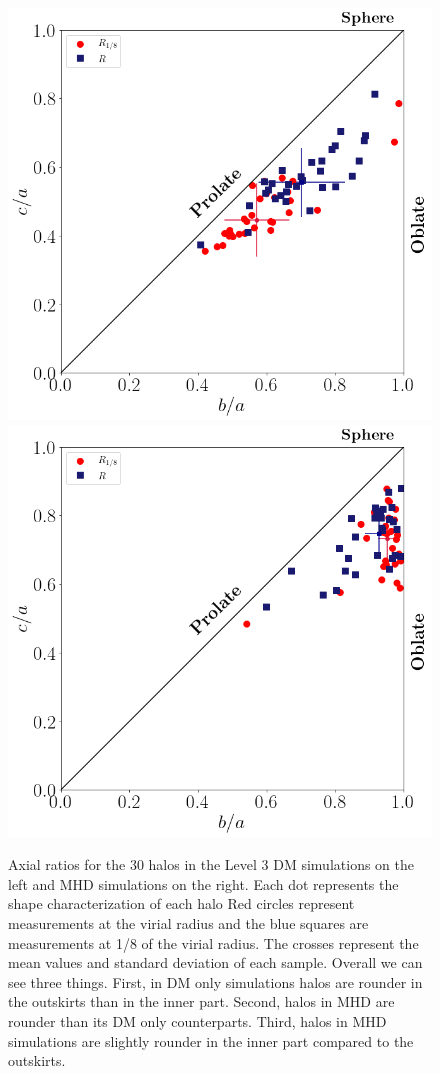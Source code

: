 \documentclass[a4paper,fleqn,usenatbib]{mnras}
\begin{document}
 
\begin{figure}
\begin{center}
\includegraphics[width=0.9\columnwidth]{./pics/Triaxial_Plane/Lvl_4_Triax_Plane_DM.png}
 \includegraphics[width=0.9\columnwidth]{./pics/Triaxial_Plane/Lvl_4_Triax_Plane_MHD.png}
\end{center}
\caption{Axial ratios for the 30 halos in the Level 3 DM simulations
  on the left and MHD simulations on the right.
   Each dot represents the shape characterization of each halo 
   Red circles represent measurements at the virial radius and the
   blue squares are measurements at 1/8 of the virial radius.   
   The crosses represent the mean values and standard deviation of
   each sample.
   Overall we can see three things. 
   First, in DM only simulations halos are rounder in the outskirts
   than in the inner part.
   Second, halos in MHD are rounder than its DM only counterparts.
   Third, halos in MHD simulations are slightly rounder in the inner
   part compared to the outskirts.}
  \label{fig:triax_DM_MHD}
\end{figure}
\end{document}
